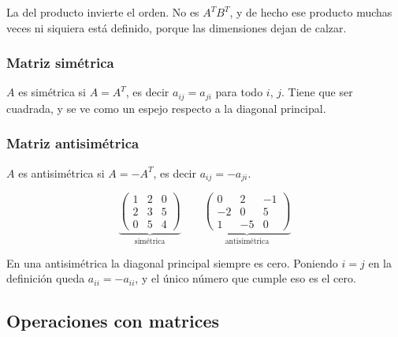 \documentclass[11pt,letterpaper]{article}
\begin{document}
\begin{ojo}
    La del producto invierte el orden. No es $A^{T}B^{T}$, y de hecho
    ese producto muchas veces ni siquiera está definido, porque las
    dimensiones dejan de calzar.
\end{ojo}

\subsubsection*{Matriz simétrica}

\begin{definicion}[Simétrica]
    $A$ es simétrica si $A = A^{T}$, es decir $a_{ij} = a_{ji}$ para
    todo $i$, $j$. Tiene que ser cuadrada, y se ve como un espejo
    respecto a la diagonal principal.
\end{definicion}

\subsubsection*{Matriz antisimétrica}

\begin{definicion}[Antisimétrica]
    $A$ es antisimétrica si $A = -A^{T}$, es decir
    $a_{ij} = -a_{ji}$.
\end{definicion}

\[
    \underbrace{\begin{pmatrix}
        1 & 2 & 0 \\ 2 & 3 & 5 \\ 0 & 5 & 4
    \end{pmatrix}}_{\text{simétrica}}
    \qquad
    \underbrace{\begin{pmatrix}
        0 & 2 & -1 \\ -2 & 0 & 5 \\ 1 & -5 & 0
    \end{pmatrix}}_{\text{antisimétrica}}
\]

\begin{idea}
    En una antisimétrica la diagonal principal siempre es cero.
    Poniendo $i = j$ en la definición queda $a_{ii} = -a_{ii}$, y el
    único número que cumple eso es el cero.
\end{idea}


\subsection*{Operaciones con matrices}
\end{document}

